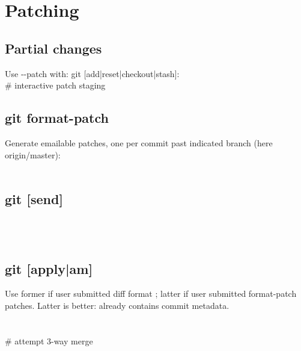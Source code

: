 \section{Patching}


\subsection*{Partial changes}
Use -{}-patch with: git [add|reset|checkout|stash]: \\
 \# interactive patch staging

\subsection*{git format-patch}
Generate emailable patches, one per commit 
past indicated branch (here origin/master): \\
\\


\subsection*{git [send]}
\\
\\


\subsection*{git [apply|am]}
{\footnotesize Use former if user submitted diff format ; latter if user submitted format-patch patches.  Latter is better: already contains commit metadata.}\\
\\
\\
 \# attempt 3-way merge\\

